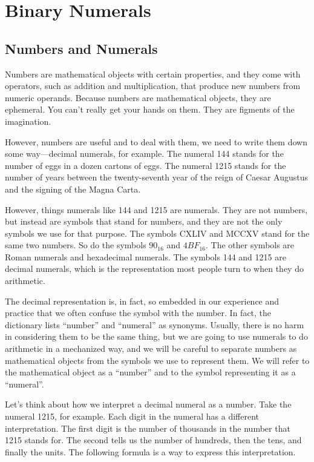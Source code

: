 \chapter{Binary Numerals}
\label{ch:binary-numerals}
\section{Numbers and Numerals}
\label{sec:numbers-numerals}
Numbers are mathematical objects with certain properties,
and they come with operators, such as addition
and multiplication, that produce new numbers from numeric
operands.
Because numbers are mathematical objects, they are ephemeral.
You can't really get your hands on them.
They are figments of the imagination.

However, numbers are useful and to deal with them,
we need to write them down some way---decimal numerals, for example.
The numeral 144 stands for the number
of eggs in a dozen cartons of eggs.
The numeral 1215 stands for the number of
years between the twenty-seventh year of the reign
of Caesar Augustus and the signing of the Magna Carta.

However, things numerals like 144 and 1215 are numerals.
They are not numbers, but instead are symbols that stand for numbers,
and they are not the only symbols we use for that purpose.
The symbols CXLIV and MCCXV stand for the same two numbers.
So do the symbols $90_{16}$ and $4BF_{16}$.
The other symbols are Roman numerals and hexadecimal numerals.
The symbols 144 and 1215 are decimal numerals,
which is the representation most
people turn to when they do arithmetic.

The decimal representation is, in fact, so embedded in
our experience and practice that we often confuse
the symbol with the number.
In fact, the dictionary lists ``number'' and ``numeral'' as synonyms.
Usually, there is no harm in considering them to be the same thing,
but we are going to use numerals
to do arithmetic in a mechanized way, and we will
be careful to separate numbers as mathematical
objects from the symbols we use to represent them.
We will refer to the mathematical object as a ``number''
and to the symbol representing it as a ``numeral''.

Let's think about how we interpret a decimal numeral as a number.
Take the numeral 1215, for example.
Each digit in the numeral has a different interpretation.
The first digit is the number of thousands in the number
that 1215 stands for. The second tells us the number
of hundreds, then the tens, and finally the units.
The following formula is a way to express this interpretation.

